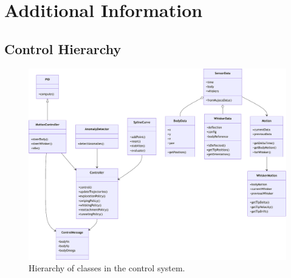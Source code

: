 \chapter{Additional Information}

\section{Control Hierarchy}
\begin{figure}
    \centering
    \includegraphics[width=\textwidth]{figures/diagrams/control-hierarchy}
    \caption{Hierarchy of classes in the control system.}
    \label{fig:control-hierarchy}
\end{figure}
